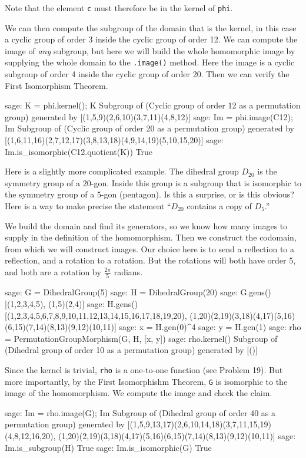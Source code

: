 %
Note that the element \verb?c? must therefore be in the kernel of \verb?phi?.\par
%
We can then compute the subgroup of the domain that is the kernel, in this case a cyclic group of order 3 inside the cyclic group of order 12.  We can compute the image of \emph{any} subgroup, but here we will build the whole homomorphic image by supplying the whole domain to the \verb?.image()? method.  Here the image is a cyclic subgroup of order 4 inside the cyclic group of order 20.  Then we can verify the First Isomorphism Theorem.
%
\begin{sageexample}
sage: K = phi.kernel(); K
Subgroup of (Cyclic group of order 12 as a permutation group) 
generated by [(1,5,9)(2,6,10)(3,7,11)(4,8,12)]
sage: Im = phi.image(C12); Im
Subgroup of (Cyclic group of order 20 as a permutation group) 
generated by [(1,6,11,16)(2,7,12,17)(3,8,13,18)(4,9,14,19)(5,10,15,20)]
sage: Im.is_isomorphic(C12.quotient(K))
True
\end{sageexample}
%
Here is a slightly more complicated example.  The dihedral group $D_{20}$ is the symmetry group of a $20$-gon.  Inside this group is a subgroup that is isomorphic to the symmetry group of a $5$-gon (pentagon).  Is this a surprise, or is this obvious?  Here is a way to make precise the statement ``$D_{20}$ contains a copy of $D_{5}$.''\par
%
We build the domain and find its generators, so we know how many images to supply in the definition of the homomorphism.  Then we construct the codomain, from which we will construct images.  Our choice here is to send a reflection to a reflection, and a rotation to a rotation.  But the rotations will both have order 5, and both are a rotation by $\frac{2\pi}{5}$ radians.
%
\begin{sageexample}
sage: G = DihedralGroup(5)
sage: H = DihedralGroup(20)
sage: G.gens()
[(1,2,3,4,5), (1,5)(2,4)]
sage: H.gens()
[(1,2,3,4,5,6,7,8,9,10,11,12,13,14,15,16,17,18,19,20),
 (1,20)(2,19)(3,18)(4,17)(5,16)(6,15)(7,14)(8,13)(9,12)(10,11)]
sage: x = H.gen(0)^4
sage: y = H.gen(1)
sage: rho = PermutationGroupMorphism(G, H, [x, y])
sage: rho.kernel()
Subgroup of (Dihedral group of order 10 as a permutation group) 
generated by [()]
\end{sageexample}
%
Since the kernel is trivial, \verb?rho? is a one-to-one function (see Problem 19).  But more importantly, by the First Isomorphishm Theorem, \verb?G? is isomorphic to the image of the homomorphism.  We compute the image and check the claim.
%
\begin{sageexample}
sage: Im = rho.image(G); Im
Subgroup of (Dihedral group of order 40 as a permutation group) 
generated by 
[(1,5,9,13,17)(2,6,10,14,18)(3,7,11,15,19)(4,8,12,16,20), 
(1,20)(2,19)(3,18)(4,17)(5,16)(6,15)(7,14)(8,13)(9,12)(10,11)]
sage: Im.is_subgroup(H)
True
sage: Im.is_isomorphic(G)
True
\end{sageexample}
